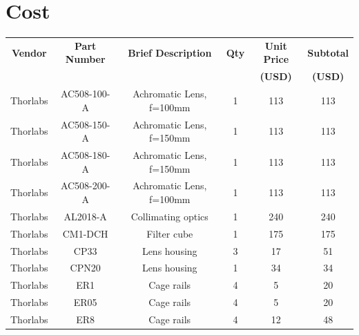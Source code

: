 \documentclass{article}
\begin{document}
\section{Cost}
\begin{table}[!h]
\centering
\begin{tabular}{cccccc}
\textbf{Vendor} & \textbf{Part Number} & \textbf{Brief Description}              & \textbf{Qty} & \textbf{Unit Price} & \textbf{Subtotal} \\
 & & & & \textbf{(USD)} & \textbf{(USD)} \\
Thorlabs        & AC508-100-A          & Achromatic Lens, f=100mm                & 1            & 113                       & 113                     \\
Thorlabs        & AC508-150-A          & Achromatic Lens, f=150mm                & 1            & 113                       & 113                     \\
Thorlabs        & AC508-180-A          & Achromatic Lens, f=150mm                & 1            & 113                       & 113                     \\
Thorlabs        & AC508-200-A          & Achromatic Lens, f=100mm                & 1            & 113                       & 113                     \\
Thorlabs        & AL2018-A             & Collimating optics                      & 1            & 240                       & 240                     \\
Thorlabs        & CM1-DCH              & Filter cube                             & 1            & 175                       & 175                     \\
Thorlabs        & CP33                 & Lens housing                            & 3            & 17                        & 51                      \\
Thorlabs        & CPN20                & Lens housing                            & 1            & 34                        & 34                      \\
Thorlabs        & ER1                  & Cage rails                              & 4            & 5                         & 20                      \\
Thorlabs        & ER05                 & Cage rails                              & 4            & 5                         & 20                      \\
Thorlabs        & ER8                  & Cage rails                              & 4            & 12                        & 48                      \\

\end{tabular}
\end{table}
\end{document}
